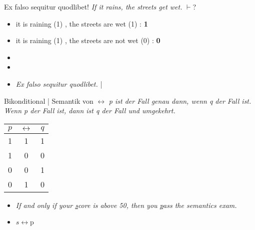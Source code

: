 \begin{frame}
  {Ex falso sequitur quodlibet!}
  \onslide<+->
  \onslide<+->
  \alert{\textit{If it rains, the streets get wet.}} $\vdash$? \\
  \Halbzeile
  \begin{itemize}[<+->]
    \item it is raining (\alert{1}) , the streets are wet (\alert{1}) : \alert{\textbf{1}}
    \item it is raining (\alert{1}) , the streets are not wet (\alert{0}) : \alert{\textbf{0}}
    \item {}
    \item {}
      \Halbzeile
    \item \textit{Ex falso sequitur quodlibet.} | 
  \end{itemize}
\end{frame}

\begin{frame}
  {Bikonditional | Semantik von $\leftrightarrow$}
  \onslide<+->
  \onslide<+->
  \textit{p ist der Fall genau dann, wenn q der Fall ist.}\\
  \textit{Wenn p der Fall ist, dann ist q der Fall und umgekehrt.}\\
  \onslide<+->
  \Halbzeile
  \begin{center}
    \begin{tabular}{ccc}
      $p$ & $\leftrightarrow$ & $q$\\
      \hline
      1 & \alert{1} & 1 \\
      1 & \alert{0} & 0 \\
      0 & \alert{0} & 1 \\
      0 & \alert{1} & 0 \\
    \end{tabular}
  \end{center}
  \Halbzeile
  \begin{itemize}[<+->]
    \item \textit{\alert{If and only if} your \underline{s}core is above 50, \alert{then} you \underline{p}ass the semantics exam.}
    \item \alert{$s\leftrightarrow$p}
  \end{itemize}
\end{frame}


